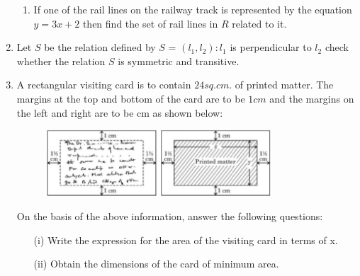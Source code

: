 \documentclass{article}
\begin{document}
\begin{enumerate}
\begin{enumerate}
\item If one of the rail lines on the railway track is represented by the equation $y = 3x + 2$ then find the set of rail lines in $R$ related to it.

\end{enumerate}
\item Let $S$ be the relation defined by $S$ = {$( l_{1},l_{2}):l_{1}$ is perpendicular to $l_{2}$} check whether the relation $S$ is symmetric and transitive.

\item A rectangular visiting card is to contain $24 sq.cm.$ of printed matter. The margins at the top and bottom of the card are to be $1 cm$ and the margins on the left and right are to be cm as shown below:

\newpage
\begin{figure}[h!]
\centering
\includegraphics[width=0.8\textwidth]{images/fig2.jpg}
\label{fig:image2}
\end{figure}

On the basis of the above information, answer the following questions:
\begin{enumerate}
	\item[(i)] Write the expression for the area of the visiting card in terms of x.

	\item[(ii)] Obtain the dimensions of the card of minimum area.



\end{enumerate}
\end{enumerate}
\end{document}
